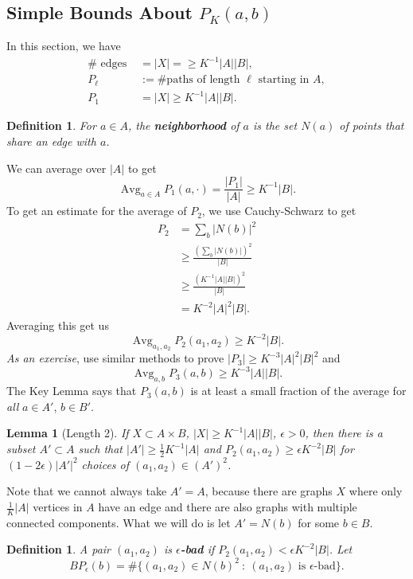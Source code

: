 \documentclass[12pt]{amsart}
\newtheorem{lemma}[theorem]{Lemma}
\newtheorem{Definition}[theorem]{Definition}
\begin{document}
\subsection{Simple Bounds About $P_K(a, b)$}
In this section, we have
\begin{align*}
    \# \text{ edges } & = |X| = \geq K^{-1} |A||B|, \\
    P_\ell & := \# \text{paths of length $\ell$ starting in $A$}, \\
    P_1 & = |X| \geq K^{-1} |A||B|.
\end{align*}
\begin{Definition}
    For $a \in A$, the \textbf{neighborhood} of $a$ is the set $N(a)$ of points that share an edge with $a$.
\end{Definition}
We can average over $|A|$ to get
\[
    \operatorname{Avg}_{a \in A} P_1(a, \cdot) = \frac{|P_1|}{|A|} \geq K^{-1} |B|.
\]
To get an estimate for the average of $P_2$, we use Cauchy-Schwarz to get
\begin{align*}
    P_2 & = \sum_b |N(b)|^2 \\
    & \geq \frac{\left( \sum_b |N(b)| \right)^2}{|B|} \\
    & \geq \frac{(K^{-1}|A||B|)^2}{|B|} \\
    & = K^{-2} |A|^2 |B|.
\end{align*}
Averaging this get us
\[
    \operatorname{Avg}_{a_1, a_2} P_2(a_1, a_2) \geq K^{-2} |B|.
\]
\emph{As an exercise}, use similar methods to prove $|P_3| \geq K^{-3} |A|^2 |B|^2$ and
\[
    \operatorname{Avg}_{a, b} P_3(a, b) \geq K^{-3} |A| |B|.
\]
The Key Lemma says that $P_3(a, b)$ is at least a small fraction of the average for \emph{all} $a \in A'$, $b \in B'$.
\begin{lemma}[Length 2]
    If $X \subset A \times B$, $|X| \geq K^{-1} |A||B|$, $\epsilon > 0$, then there is a subset $A' \subset A$ such that $|A'| \geq \frac{1}{2} K^{-1} |A|$ and $P_2(a_1, a_2) \geq \epsilon K^{-2} |B|$ for $(1 - 2\epsilon) |A'|^2$ choices of $(a_1, a_2) \in (A')^2$.
\end{lemma}
Note that we cannot always take $A' = A$, because there are graphs $X$ where only $\frac{1}{K} |A|$ vertices in $A$ have an edge and there are also graphs with multiple connected components. What we will do is let $A' = N(b)$ for some $b \in B$.
\begin{Definition}
    A pair $(a_1, a_2)$ is \textbf{$\epsilon$-bad} if $P_2(a_1, a_2) < \epsilon K^{-2} |B|$. Let
    \[
        BP_\epsilon(b) = \# \{ (a_1, a_2) \in N(b)^2 \ : \ (a_1, a_2) \text{ is $\epsilon$-bad} \}.
    \]
\end{Definition}
\end{document}
